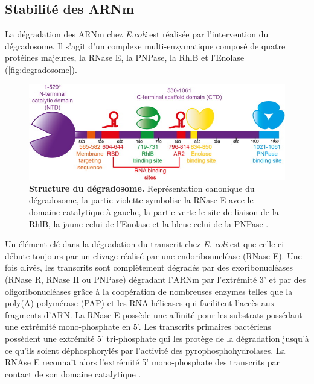 \documentclass[12pt,a4paper]{report}
\begin{document}
\begin{onehalfspace}
\subsection*{Stabilité des ARNm}
La dégradation des ARNm chez \textit{E.coli} est réalisée par l'intervention du dégradosome. Il s'agit d'un complexe multi-enzymatique composé de quatre protéines majeures, la RNase E, la PNPase, la RhlB et l'Enolase (\autoref{fig:degradosome}).

\begin{figure}[ht]
\centerline{\includegraphics[scale=4]{figures/degradosome.jpg}}
\caption{\textbf{Structure du dégradosome.} Représentation canonique du dégradosome, la partie violette symbolise la RNase E avec le domaine catalytique à gauche, la partie verte le site de liaison de la RhlB, la jaune celui de l'Enolase et la bleue celui de la PNPase \citep{Bandyra2013}.}
\label{fig:degradosome} 
\end{figure}

Un élément clé dans la dégradation du transcrit chez \textit{E. coli} est que celle-ci débute toujours par un clivage réalisé par une endoribonucléase (RNase E). Une fois clivés, les transcrits sont complètement dégradés par des exoribonucléases (RNase R, RNase II ou PNPase) dégradant l'ARNm par l'extrémité 3' et par des oligoribonucléases grâce à la coopération de nombreuses enzymes telles que la poly(A) polymérase (PAP) et les RNA hélicases qui facilitent l'accès aux fragments d'ARN. La RNase E possède une affinité pour les substrats possédant une extrémité mono-phosphate en 5'. Les transcrits primaires bactériens possèdent une extrémité 5' tri-phosphate qui les protège de la dégradation jusqu'à ce qu'ils soient déphosphorylés par l'activité des pyrophosphohydrolases. La RNAse E reconnaît alors l'extrémité 5' mono-phosphate des transcrits par contact de son domaine catalytique \citep{Callaghan2005,Bandyra2013}.


\end{onehalfspace}
\end{document}
